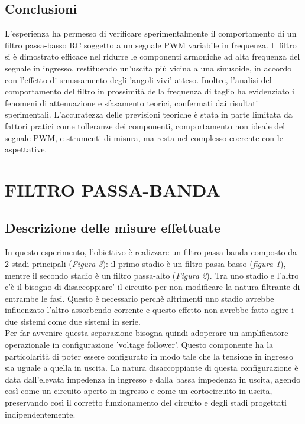 \documentclass{article}
\begin{document}
\subsection{Conclusioni}
  L’esperienza ha permesso di verificare sperimentalmente il comportamento di
  un filtro passa-basso RC soggetto a un segnale PWM variabile in frequenza.
  Il filtro si è dimostrato efficace nel ridurre le componenti armoniche ad alta
  frequenza del segnale in ingresso, restituendo un’uscita più vicina a una sinusoide,
  in accordo con l’effetto di smussamento degli 'angoli vivi' atteso. Inoltre, l’analisi del
  comportamento del filtro in prossimità della frequenza di taglio ha evidenziato
  i fenomeni di attenuazione e sfasamento teorici, confermati dai risultati
  sperimentali. L’accuratezza delle previsioni teoriche è stata in parte limitata da fattori
  pratici come tolleranze dei componenti, comportamento non ideale del segnale
  PWM, e strumenti di misura, ma resta nel complesso coerente con le aspettative.

\newpage

\section{FILTRO PASSA-BANDA}

  \subsection{Descrizione delle misure effettuate}
    In questo esperimento, l’obiettivo è realizzare un filtro passa-banda composto da 
    2 stadi principali (\textit{Figura 3}): il primo stadio è un filtro passa-basso
    (\textit{figura 1}), mentre il secondo stadio è un filtro passa-alto (\textit{Figura 2}).
    Tra uno stadio e l'altro c'è il bisogno di \'disaccoppiare' il circuito per non modificare
    la natura filtrante di entrambe le fasi. Questo è necessario perchè altrimenti uno stadio avrebbe
    influenzato l'altro assorbendo corrente e questo effetto non avrebbe fatto agire i due sistemi come
    due sistemi in serie. \\
    
    \noindent Per far avvenire questa separazione bisogna quindi adoperare un amplificatore
    operazionale in configurazione 'voltage follower'. Questo componente ha la particolarità di poter essere
    configurato in modo tale che la tensione in ingresso sia uguale a quella in uscita. La natura disaccoppiante
    di questa configurazione è data dall'elevata impedenza in ingresso e dalla bassa impedenza in uscita, agendo
    così come un circuito aperto in ingresso e come un cortocircuito in uscita, preservando così il corretto funzionamento
    del circuito e degli stadi progettati indipendentemente. \\
    
\end{document}
